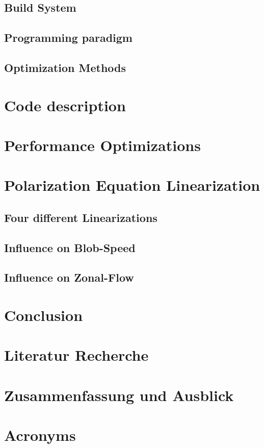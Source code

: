 \documentclass[12pt,oneside,bibtotoc,liststotoc]{scrbook}
\begin{document}
\section{Build System}

\section{Programming paradigm}

\section{Optimization Methods}



\chapter{Code description}




\chapter{Performance Optimizations}


\chapter{Polarization Equation Linearization}
\section{Four different Linearizations}
\section{Influence on Blob-Speed}
\section{Influence on Zonal-Flow}


\chapter{Conclusion}




\chapter{Literatur Recherche}


\newpage
\chapter{Zusammenfassung und Ausblick}

\newpage

%
%


\chapter{Acronyms}

\end{document}
